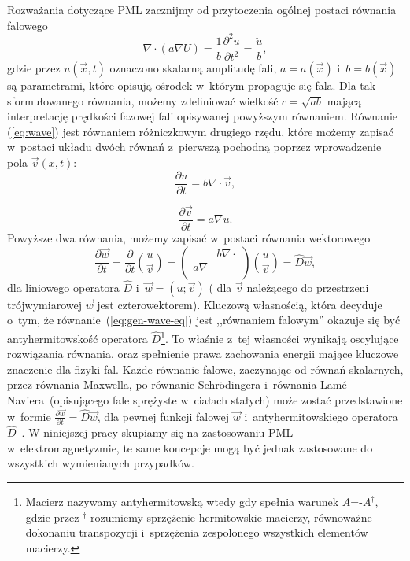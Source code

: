 Rozważania dotyczące PML zacznijmy od przytoczenia ogólnej postaci równania falowego~\cite{barton1989elements}
\begin{equation}
\nabla \cdot ( a \nabla U) = \frac{1}{b} \frac{\partial^2 u}{\partial t^2} = \frac{\ddot{u}}{b},
\label{eq:wave}
\end{equation}
gdzie przez $u(\vec{x},t)$ oznaczono skalarną amplitudę fali, $a=a(\vec{x})$ i~$b=b(\vec{x})$ są parametrami, które opisują ośrodek w~którym propaguje się fala. Dla tak sformułowanego równania, możemy zdefiniować wielkość $c=\sqrt{ab}$ mającą interpretację prędkości fazowej fali opisywanej powyższym równaniem. Równanie (\ref{eq:wave}) jest równaniem różniczkowym drugiego rzędu, które możemy zapisać w~postaci układu dwóch równań z~pierwszą pochodną poprzez wprowadzenie pola $\vec{v}(x,t)$:
\begin{equation}
\frac{\partial u}{\partial t} = b \nabla \cdot \vec{v},
\end{equation}

\begin{equation}
\frac{\partial \vec{v}}{\partial t}= a\nabla u.
\end{equation}
Powyższe dwa równania, możemy zapisać  w~postaci równania wektorowego
\begin{equation}
\frac{\partial \vec{w}}{\partial t}=\frac{\partial}{\partial t} {u \choose \vec{v}} = 
	\begin{pmatrix}
		& b\nabla\cdot \\
	a\nabla & \\
	\end{pmatrix}
{u \choose \vec{v}} = \hat{D}\vec{w},
\label{eq:gen-wave-eq}
\end{equation}
dla liniowego operatora $\hat{D}$ i~$\vec{w}=(u;\vec{v})$ ( dla $\vec{v}$ należącego do przestrzeni trójwymiarowej $\vec{w}$ jest czterowektorem). Kluczową własnością, która decyduje o~tym, że równanie~(\ref{eq:gen-wave-eq}) jest ,,równaniem falowym''  okazuje się być antyhermitowskość operatora $\hat{D}$\footnote{Macierz nazywamy antyhermitowską wtedy gdy spełnia warunek $A$=-$A^\dag$, gdzie przez $^\dag$ rozumiemy sprzężenie hermitowskie macierzy, równoważne dokonaniu transpozycji i~sprzężenia zespolonego wszystkich elementów macierzy.}. To właśnie z~tej własności wynikają oscylujące rozwiązania równania, oraz spełnienie prawa zachowania energii mające kluczowe znaczenie dla fizyki fal. Każde równanie falowe, zaczynając od równań skalarnych, przez równania Maxwella,  po równanie Schr\"{o}dingera i~równania Lam\'{e}-Naviera~(opisującego fale sprężyste w~ciałach stałych) może zostać przedstawione w~formie $ \frac{\partial  \vec{w}}{\partial t}=\hat{D}\vec{w}$, dla pewnej funkcji falowej $\vec{w}$ i~antyhermitowskiego operatora $\hat{D}$~\cite{johnson2007notes}. W niniejszej pracy skupiamy się na zastosowaniu PML w~elektromagnetyzmie, te same koncepcje mogą być jednak zastosowane do wszystkich wymienianych przypadków.

